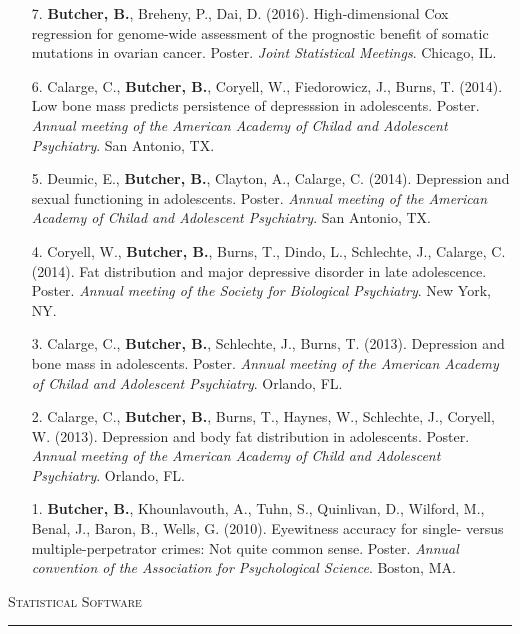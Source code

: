 \documentclass[a4paper]{article}
\begin{document}
\begin{enumerate}
  \item[7.] \textbf{Butcher, B.}, Breheny, P., Dai, D. (2016).
    High-dimensional Cox regression for genome-wide assessment of the prognostic
    benefit of somatic mutations in ovarian cancer. Poster.
    \textit{Joint Statistical Meetings}. Chicago, IL.

  \item[6.] Calarge, C., \textbf{Butcher, B.}, Coryell, W., Fiedorowicz, J.,
    Burns, T. (2014). Low bone mass predicts persistence of depresssion in
    adolescents. Poster. \textit{Annual meeting of the
    American Academy of Chilad and Adolescent Psychiatry}. San Antonio, TX.

  \item[5.] Deumic, E., \textbf{Butcher, B.}, Clayton, A., Calarge, C. (2014).
    Depression and sexual functioning in adolescents. Poster. \textit{Annual meeting of the
    American Academy of Chilad and Adolescent Psychiatry}. San Antonio, TX.

  \item[4.] Coryell, W., \textbf{Butcher, B.}, Burns, T., Dindo, L., Schlechte, J.,
    Calarge, C. (2014). Fat distribution and major depressive disorder in late
    adolescence. Poster. \textit{Annual meeting of the Society for Biological Psychiatry}.
    New York, NY.

  \item[3.] Calarge, C., \textbf{Butcher, B.}, Schlechte, J., Burns, T. (2013).
    Depression and bone mass in adolescents. Poster. \textit{Annual meeting of the
    American Academy of Chilad and Adolescent Psychiatry}. Orlando, FL.

  \item[2.] Calarge, C., \textbf{Butcher, B.}, Burns, T., Haynes, W., Schlechte,
    J., Coryell, W. (2013). Depression and body fat distribution in adolescents.
    Poster. \textit{Annual meeting of the American Academy of Child and Adolescent
    Psychiatry}. Orlando, FL.

  \item[1.] \textbf{Butcher, B.}, Khounlavouth, A., Tuhn, S., Quinlivan, D.,
    Wilford, M., Benal, J., Baron, B., Wells, G. (2010). Eyewitness accuracy for
    single- versus multiple-perpetrator crimes: Not quite common sense. Poster.
    \textit{Annual convention of the Association for Psychological Science}.
    Boston, MA.

\end{enumerate}


\begin{flushleft}
  \Large\textsc{Statistical Software}
  \textcolor{usafagrey}{\rule[0.5\baselineskip]{\textwidth}{0.75pt}}
\end{flushleft}
\vspace{-1.5\baselineskip}
\end{document}
